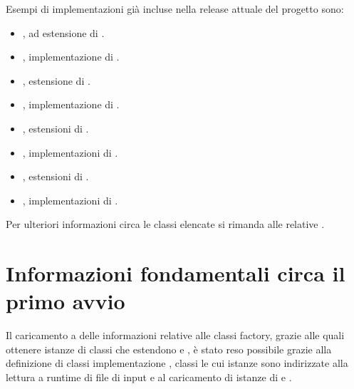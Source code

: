 \documentclass[letterpaper,10pt,italian,openany,oneside]{sphinxmanual}
\begin{document}
Esempi di implementazioni già incluse nella release attuale del progetto sono:
\begin{itemize}
\item {} 
, ad estensione di .

\item {} 
, implementazione di .

\item {} 
, estensione di .

\item {} 
, implementazione di .

\item {} 
, estensioni di .

\item {} 
, implementazioni di .

\item {} 
, estensioni di .

\item {} 
, implementazioni di .

\end{itemize}

Per ulteriori informazioni circa le classi elencate si rimanda alle relative {\hyperref[\detokenize{source/packages::doc}]{}}.


\section{Informazioni fondamentali circa il primo avvio}
\label{\detokenize{introduzione:informazioni-fondamentali-circa-il-primo-avvio}}
Il caricamento a  delle informazioni relative alle classi factory, grazie alle quali ottenere istanze di classi che estendono
 e , è stato reso possibile grazie alla definizione di classi implementazione , classi le cui istanze sono indirizzate
alla lettura a runtime di file di input e al caricamento di istanze di  e .
\end{document}
